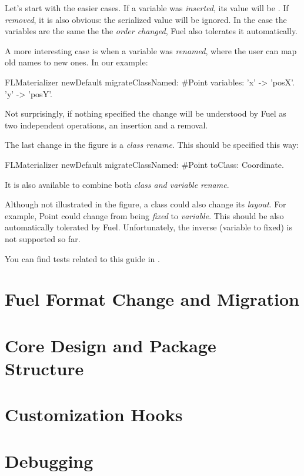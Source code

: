 \documentclass[a4paper,10pt,twoside]{book}
\begin{document}
Let's start with the easier cases. If a variable was \emph{inserted}, its value will be . If \emph{removed}, it is also obvious: the serialized value will be ignored. In the case the variables are the same the the \emph{order changed}, Fuel also tolerates it automatically.

A more interesting case is when a variable was \emph{renamed}, where the user can map old names to new ones. In our example:

\begin{code}
FLMaterializer newDefault
	migrateClassNamed: #Point
	variables: {'x' -> 'posX'. 'y' -> 'posY'}.
\end{code}

Not surprisingly, if nothing specified the change will be understood by Fuel as two independent operations, an insertion and a removal.

The last change in the figure is a \emph{class rename}. This should be specified this way:

\begin{code}
FLMaterializer newDefault
	migrateClassNamed: #Point
	toClass: Coordinate.
\end{code}

It is also available  to combine both \emph{class and variable rename}.

Although not illustrated in the figure, a class could also change its \emph{layout}. For example, Point could change from being \emph{fixed} to \emph{variable}. This should be also automatically tolerated by Fuel. Unfortunately, the inverse (variable to fixed) is not supported so far.

You can find tests related to this guide in .


\section{Fuel Format Change and Migration}



\section{Core Design and Package Structure}


\section{Customization Hooks}


\section{Debugging}




\ifx\wholebook\relax\else
   
   
\end{document}
